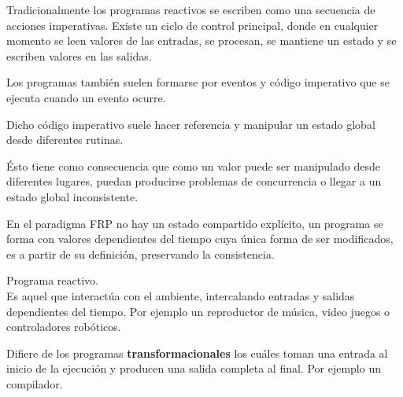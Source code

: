 
Tradicionalmente los programas reactivos
se escriben como una secuencia de acciones imperativas.
Existe un ciclo de control principal, donde en cualquier
momento se leen valores de las entradas, se procesan,
se mantiene un estado y se escriben valores en las salidas.

Los programas también suelen formarse por eventos
y código imperativo que se ejecuta cuando un evento ocurre.

Dicho código imperativo suele hacer referencia y manipular
un estado global desde diferentes rutinas.

Ésto tiene como consecuencia que
como un valor puede ser manipulado desde diferentes lugares,
puedan producirse problemas de concurrencia o llegar a un
estado global inconsistente.

En el paradigma FRP no hay un estado compartido explícito,
un programa se forma con valores dependientes del tiempo
cuya única forma de ser modificados,
es a partir de su definición, preservando la consistencia.

\begin{definicion}
Programa reactivo.\\
Es aquel que interactúa con el ambiente, intercalando entradas
y salidas dependientes del tiempo. Por ejemplo un reproductor
de música, video juegos o controladores robóticos.

Difiere de los programas \textbf{transformacionales} los cuáles
toman una entrada al inicio de la ejecución y producen una salida
completa al final. Por ejemplo un compilador.
\end{definicion}


